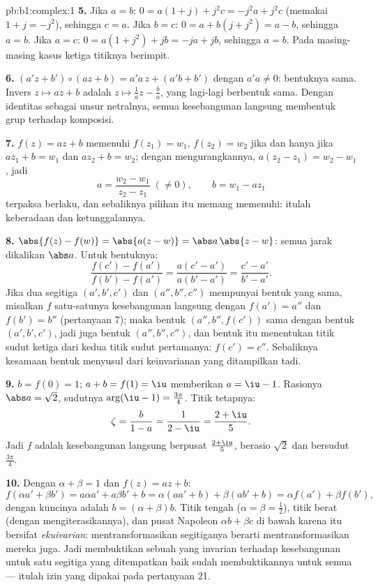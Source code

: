 \begin{solution}{pb:b1:complex:1}
\textbf{5.} Jika $a = b$: $0 = a(1 + j) + j^2 c = -j^2 a + j^2 c$
(memakai $1 + j = -j^2$), sehingga $c = a$. Jika $b = c$: $0 = a + b(j + j^2)
= a - b$, sehingga $a = b$. Jika $a = c$: $0 = a(1 + j^2) + jb = -ja + jb$,
sehingga $a = b$. Pada masing-masing kasus ketiga titiknya berimpit.

\textbf{6.} $(a'z + b') \circ (az + b) = a'a\,z + (a'b + b')$ dengan
$a'a \neq 0$: bentuknya sama. Invers $z \mapsto az + b$ adalah $z
\mapsto \frac1a z - \frac ba$, yang lagi-lagi berbentuk sama. Dengan
 identitas sebagai unsur netralnya, semua kesebangunan langsung
membentuk grup terhadap komposisi.

\textbf{7.} $f(z) = az + b$ memenuhi $f(z_1) = w_1$, $f(z_2) =
w_2$ jika dan hanya jika $a z_1 + b = w_1$ dan $a z_2 + b = w_2$; dengan mengurangkannya,
$a(z_2 - z_1) = w_2 - w_1$, jadi
\[
a = \frac{w_2 - w_1}{z_2 - z_1} \;(\neq 0), \qquad
b = w_1 - a z_1
\]
terpaksa berlaku, dan sebaliknya pilihan itu memang memenuhi: itulah keberadaan
dan ketunggalannya.

\textbf{8.} $\abs{f(z) - f(w)} = \abs{a(z - w)} = \abs a\,\abs{z -
w}$: semua jarak dikalikan $\abs a$. Untuk bentuknya:
\[
\frac{f(c') - f(a')}{f(b') - f(a')} = \frac{a(c' -
a')}{a(b' - a')} = \frac{c' - a'}{b' - a'} .
\]
Jika dua segitiga $(a', b', c')$ dan $(a'', b'', c'')$ mempunyai bentuk
yang sama, misalkan $f$ satu-satunya kesebangunan langsung dengan $f(a') = a''$
dan $f(b') = b''$ (pertanyaan 7); maka bentuk $(a'', b'',
f(c'))$ sama dengan bentuk $(a', b', c')$, jadi juga bentuk $(a'', b'',
c'')$, dan bentuk itu menentukan titik sudut ketiga dari kedua titik sudut
pertamanya: $f(c') = c''$. Sebaliknya kesamaan bentuk menyusul dari
keinvarianan yang ditampilkan tadi.

\textbf{9.} $b = f(0) = 1$; $a + b = f(1) = \iu$ memberikan $a = \iu -
1$. Rasionya $\abs a = \sqrt2$, sudutnya $\arg(\iu - 1) =
\frac{3\pi}4$. Titik tetapnya:
\[
\zeta = \frac{b}{1 - a} = \frac1{2 - \iu} = \frac{2 + \iu}5 .
\]
Jadi $f$ adalah kesebangunan langsung berpusat $\frac{2+\iu}5$, berasio
$\sqrt2$ dan bersudut $\frac{3\pi}4$.

\textbf{10.} Dengan $\alpha + \beta = 1$ dan $f(z) = az + b$:
\[
f(\alpha a' + \beta b') = a\alpha a' + a\beta b' + b
= \alpha(a a' + b) + \beta(a b' + b)
= \alpha f(a') + \beta f(b') ,
\]
dengan kuncinya adalah $b = (\alpha + \beta)b$. Titik tengah ($\alpha = \beta =
\frac12$), titik berat (dengan mengiterasikannya), dan pusat Napoleon $\alpha b
+ \beta c$ di bawah karena itu bersifat \emph{ekuivarian}: mentransformasikan
segitiganya berarti mentransformasikan mereka juga. Jadi membuktikan sebuah
 yang invarian terhadap kesebangunan untuk satu segitiga yang ditempatkan baik
sudah membuktikannya untuk semua --- itulah izin yang dipakai pada pertanyaan 21.


\end{solution}
